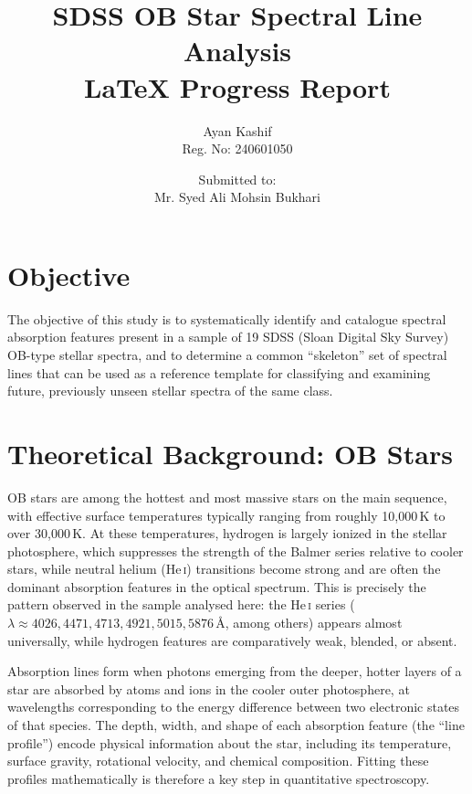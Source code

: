 \documentclass[12pt]{article}
\title{\textbf{SDSS OB Star Spectral Line Analysis}\\
\large LaTeX Progress Report}
\author{Ayan Kashif \\ \small Reg. No: 240601050}
\date{Submitted to:\\Mr. Syed Ali Mohsin Bukhari}
\begin{document}
\maketitle
\thispagestyle{empty}

\begin{center}

\end{center}
 
\clearpage
\tableofcontents
\clearpage
\listoftables
\clearpage
 

\section{Objective}
\label{sec:objective}
 
The objective of this study is to systematically identify and catalogue spectral absorption features present in a sample of 19 SDSS (Sloan Digital Sky Survey) OB-type stellar spectra, and to determine a common ``skeleton'' set of spectral lines that can be used as a reference template for classifying and examining future, previously unseen stellar spectra of the same class.
 

\section{Theoretical Background: OB Stars}
\label{sec:theory}
 
OB stars are among the hottest and most massive stars on the main sequence, with effective surface temperatures typically ranging from roughly 10{,}000\,K to over 30{,}000\,K. At these temperatures, hydrogen is largely ionized in the stellar photosphere, which suppresses the strength of the Balmer series relative to cooler stars, while neutral helium (He\,\textsc{i}) transitions become strong and are often the dominant absorption features in the optical spectrum. This is precisely the pattern observed in the sample analysed here: the He\,\textsc{i} series ($\lambda \approx 4026, 4471, 4713, 4921, 5015, 5876$\,\r{A}, among others) appears almost universally, while hydrogen features are comparatively weak, blended, or absent.
 
Absorption lines form when photons emerging from the deeper, hotter layers of a star are absorbed by atoms and ions in the cooler outer photosphere, at wavelengths corresponding to the energy difference between two electronic states of that species. The depth, width, and shape of each absorption feature (the ``line profile'') encode physical information about the star, including its temperature, surface gravity, rotational velocity, and chemical composition. Fitting these profiles mathematically is therefore a key step in quantitative spectroscopy.
 
\end{document}
